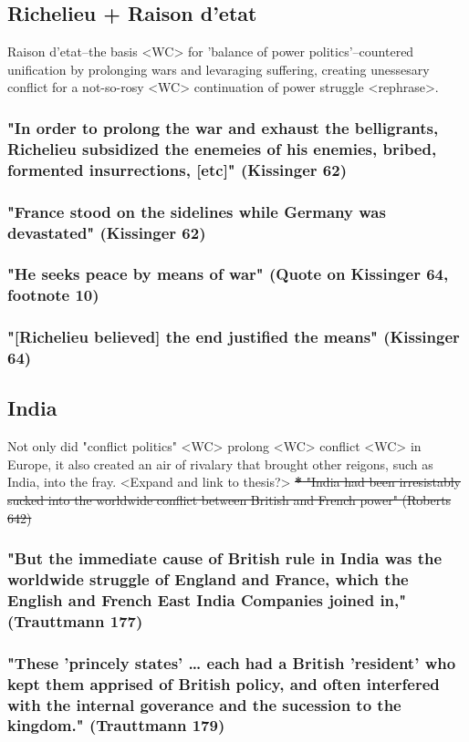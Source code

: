 \documentclass[11pt]{article}
\begin{document}
\subsection{Richelieu + Raison d'etat}
\label{sec:orgf87fea5}
Raison d'etat--the basis <WC> for 'balance of power politics'--countered unification by prolonging wars and levaraging suffering, creating unessesary conflict for a not-so-rosy <WC> continuation of power struggle <rephrase>.
\subsubsection{"In order to prolong the war and exhaust the belligrants, Richelieu subsidized the enemeies of his enemies, bribed, formented insurrections, [etc]" (Kissinger 62)}
\label{sec:orge5cafa1}
\subsubsection{"France stood on the sidelines while Germany was devastated" (Kissinger 62)}
\label{sec:org93e2817}
\subsubsection{"He seeks peace by means of war" (Quote on Kissinger 64, footnote 10)}
\label{sec:org4290e8f}
\subsubsection{"[Richelieu believed] the end justified the means" (Kissinger 64)}
\label{sec:org159346e}


\subsection{India}
\label{sec:org94c3989}
Not only did "conflict politics" <WC> prolong <WC> conflict <WC> in Europe, it also created an air of rivalary that brought other reigons, such as India, into the fray. <Expand and link to thesis?>
\sout{\textbf{*} "India had been irresistably sucked into the worldwide conflict between British and French power" (Roberts 642)}
\subsubsection{"But the immediate cause of British rule in India was the worldwide struggle of England and France, which the English and French East India Companies joined in," (Trauttmann 177)}
\label{sec:orge317e28}
\subsubsection{"These 'princely states' \ldots{} each had a British 'resident' who kept them apprised of British policy, and often interfered with the internal goverance and the sucession to the kingdom." (Trauttmann 179)}
\label{sec:orgb5b330a}
\end{document}
